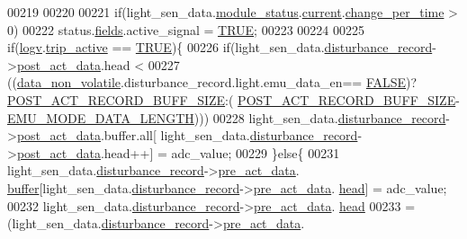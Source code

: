 \begin{DoxyCode}
00219 
00220 
00221     \textcolor{keywordflow}{if}(light\_sen\_data.\hyperlink{a00024_a5a53c391562b059eb744ac679f3765ca}{module\_status}.\hyperlink{a00017_ab8af48cdbba92b3ae39c4470e53af944}{current}.\hyperlink{a00017_ad5c4f9a39d2a36632a53205ae8eb5a5d}{change\_per\_time} > 0)
00222         status.\hyperlink{a00021_a5296d090c085b0421fdf5a86e382abea}{fields}.active\_signal = \hyperlink{a00040_aa8cecfc5c5c054d2875c03e77b7be15d}{TRUE};
00223 
00224  
00225     \textcolor{keywordflow}{if}(\hyperlink{a00021_a2e89c46668b39a17753c238950c9e1ec}{logv}.\hyperlink{a00021_a32ebd32977bc9831cd68530b2b7ec664}{trip\_active} == \hyperlink{a00040_aa8cecfc5c5c054d2875c03e77b7be15d}{TRUE})\{
00226     \textcolor{keywordflow}{if}(light\_sen\_data.\hyperlink{a00024_ac9b38e2c1d3f1013a88d33506c754152}{disturbance\_record}->\hyperlink{a00028_a9c699c0cc82d0baa6e49195f185ab34f}{post\_act\_data}.head <
00227         ((\hyperlink{a00060_a76ac5f917f5308dcd83de0d7c94559fb}{data\_non\_volatile}.disturbance\_record.light.emu\_data\_en==
      \hyperlink{a00040_aa93f0eb578d23995850d61f7d61c55c1}{FALSE})?\hyperlink{a00022_ab1ad440de86fff80e517ad748de2ee39}{POST\_ACT\_RECORD\_BUFF\_SIZE}:(
      \hyperlink{a00022_ab1ad440de86fff80e517ad748de2ee39}{POST\_ACT\_RECORD\_BUFF\_SIZE}-\hyperlink{a00022_af4c3a8ad94feb4d7bda7f107f34baf41}{EMU\_MODE\_DATA\_LENGTH})))
00228       light\_sen\_data.\hyperlink{a00024_ac9b38e2c1d3f1013a88d33506c754152}{disturbance\_record}->\hyperlink{a00028_a9c699c0cc82d0baa6e49195f185ab34f}{post\_act\_data}.buffer.all[
      light\_sen\_data.\hyperlink{a00024_ac9b38e2c1d3f1013a88d33506c754152}{disturbance\_record}->\hyperlink{a00028_a9c699c0cc82d0baa6e49195f185ab34f}{post\_act\_data}.head++] = adc\_value;
00229     \}\textcolor{keywordflow}{else}\{
00231     light\_sen\_data.\hyperlink{a00024_ac9b38e2c1d3f1013a88d33506c754152}{disturbance\_record}->\hyperlink{a00028_aab01e8da056827bc5c9caff9b64c78be}{pre\_act\_data}.
      \hyperlink{a00022_ad611012074e252bf84c1cfb8c273dd79}{buffer}[light\_sen\_data.\hyperlink{a00024_ac9b38e2c1d3f1013a88d33506c754152}{disturbance\_record}->\hyperlink{a00028_aab01e8da056827bc5c9caff9b64c78be}{pre\_act\_data}.
      \hyperlink{a00022_a15a6827ccabba1c22396eccc1c5c654b}{head}] = adc\_value;
00232     light\_sen\_data.\hyperlink{a00024_ac9b38e2c1d3f1013a88d33506c754152}{disturbance\_record}->\hyperlink{a00028_aab01e8da056827bc5c9caff9b64c78be}{pre\_act\_data}.
      \hyperlink{a00022_a15a6827ccabba1c22396eccc1c5c654b}{head}
00233             = (light\_sen\_data.\hyperlink{a00024_ac9b38e2c1d3f1013a88d33506c754152}{disturbance\_record}->\hyperlink{a00028_aab01e8da056827bc5c9caff9b64c78be}{pre\_act\_data}.

\end{DoxyCode}
